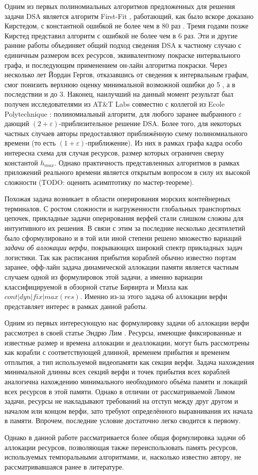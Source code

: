 Одним из первых полиномиальных алгоритмов предложенных для решения задачи DSA является алгоритм First-Fit \cite{chrobak_packing_1988}, работающий, как было вскоре доказано Кирстедом, с константной ошибкой не более чем в 80 раз \cite{kierstead_linearity_1988}.
Тремя годами позже Кирстед представил алгоритм с ошибкой не более чем в 6 раз\cite{kierstead_polynomial_1991}.
Эти и другие ранние работы объединяет общий подход сведения DSA к частному случаю с единичным размером всех ресурсов, эквивалентному покраске интервального графа, и последующим применением он-лайн алгоритма покраски.
Через несколько лет Йордан Гергов, отказавшись от сведения к интервальным графам, смог понизить верхнюю оценку минимальной возможной ошибки до 5 \cite{gergov_approximation_1996}, а в последствии и до 3\cite{gergov_algorithms_1999}.
Наконец, наилучший на данный момент результат был получен исследователями из AT\&T Labs совместно с коллегой из Ecole Polytechnique \cite{buchsbaum_opt_2003}: полиномиальный алгоритм, для любого заранее выбранного $\varepsilon$ дающий $(2+\varepsilon)$-приблизительное решение DSA.
Более того, для некоторых частных случаев авторы предоставляют приближённую схему полиномиального времени (то есть $(1+\varepsilon)$-приближение).
Из них в рамках графа кадра особо интересна схема для случая ресурсов, размер которых ограничен сверху константой $h_{max}$.
Однако практичность представленных алгоритмов в рамках приложений реального времени является открытым вопросом в силу их высокой сложности (TODO: оценить асимптотику по мастер-теореме).

Похожая задача возникает в области оперирования морских контейнерных терминалов.
С ростом сложности и нагруженности глобальных транспортных цепочек, прикладные задачи оперирования верфей стали слишком сложны для интуитивного их решения.
В связи с этим за последние несколько десятилетий было сформулировано и в той или иной степени решено множество вариаций \textit{задачи об аллокации верфи}, покрывающих широкий спектр прикладных задач логистики.
Так как расписания прибытия кораблей обычно известно портам заранее, офф-лайн задача динамической аллокации памяти является частным случаем одной из формулировок этой задачи, а именно вариации классифицируемой в обзорной статье Бирвирта и Мизла \cite{BIERWIRTH2010615} как $cont|dyn|fix|max(res)$.
Именно из-за этого задача об аллокации верфи представляет интерес в рамках данной работы.

Одним из первых интересующую нас формулировку задачи об аллокации верфи рассмотрел в своей статье Эндрю Лим \cite{LIM1998105}.
Ресурсы, имеющие фиксированные и известные размер и времена аллокации и деаллокации, могут быть рассмотрены как корабли с соответствующей длинной, временем прибытия и временем отплытия, а тип используемой видеопамяти как секция верфи.
Задача нахождения минимальной длинны всех секций верфи и точек прибытия всех кораблей аналогична нахождению минимального необходимого объёма памяти и локаций всех ресурсов в этой памяти.
Однако в отличии от рассматриваемой Лимом задачи, ресурсы не накладывают требований на отступ между друг другом и началом или концом верфи, зато требуют определённого выравнивания их начала в памяти.
Впрочем, последние условие достаточно легко сводится к первому.

Однако в данной работе рассматривается более общая формулировка задачи об аллокации ресурсов, позволяющая также переиспользовать память ресурсов, используемых темпоральными алгоритмами, и, насколько известно автору, не рассматривавшаяся ранее в литературе.
